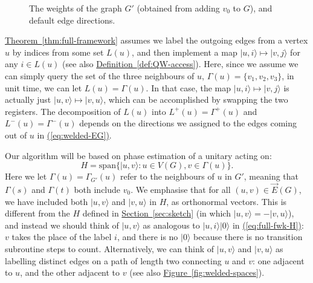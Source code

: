 \documentclass{theoretics}
\newcommand{\eq}[1]{\hyperref[eq:#1]{(\ref*{eq:#1})}}
\renewcommand{\sec}[1]{\hyperref[sec:#1]{Section~\ref*{sec:#1}}}
\newcommand{\thm}[1]{\hyperref[thm:#1]{Theorem~\ref*{thm:#1}}}
\newcommand{\defin}[1]{\hyperref[def:#1]{Definition~\ref*{def:#1}}}
\newcommand{\fig}[1]{\hyperref[fig:#1]{Figure~\ref*{fig:#1}}}
\def\ket#1{{\lvert}#1\rangle}
\renewcommand{\>}{\rangle}
\newcommand{\<}{\langle}
\renewcommand{\(}{\left(}
\renewcommand{\)}{\right)}
\begin{document}
\begin{figure}
\caption{The weights of the graph $G'$ (obtained from adding $v_0$ to $G$), and default edge directions.}\label{fig:welded-trees-weights}
\end{figure}


\thm{full-framework} assumes we label the outgoing edges from a vertex $u$ by indices from some set $L(u)$, and then implement a map $\ket{u,i}\mapsto \ket{v,j}$ for any $i\in L(u)$ (see also \defin{QW-access}). Here, since we assume we can simply query the set of the three neighbours of $u$, $\Gamma(u)=\{v_1,v_2,v_3\}$, in unit time, we can let $L(u)=\Gamma(u)$. In that case, the map $\ket{u,i}\mapsto\ket{v,j}$ is actually just $\ket{u,v}\mapsto \ket{v,u}$, which can be accomplished by swapping the two registers. The decomposition of $L(u)$ into $L^+(u)=\Gamma^+(u)$ and $L^-(u)=\Gamma^-(u)$ depends on the directions we assigned to the edges coming out of $u$ in \eq{welded-EG}. 

Our algorithm will be based on phase estimation of a unitary acting on:
\begin{equation}
H=\mathrm{span}\{\ket{u,v}:u\in V(G),v\in\Gamma(u)\}.\label{eq:welded-H}
\end{equation}
Here we let $\Gamma(u)=\Gamma_{G'}(u)$ refer to the neighbours of $u$ in $G'$, meaning that $\Gamma(s)$ and $\Gamma(t)$ both include $v_0$. We emphasise that for all $(u,v)\in \overrightarrow{E}(G)$, we have included both $\ket{u,v}$ and $\ket{v,u}$ in $H$, as orthonormal vectors. This is different from the $H$ defined in \sec{sketch} (in which $\ket{u,v}=-\ket{v,u}$), and instead we should think of $\ket{u,v}$ as analogous to $\ket{u,i}\ket{0}$ in \eq{full-fwk-H}: $v$ takes the place of the label $i$, and there is no $\ket{0}$ because there is no transition subroutine steps to count. Alternatively, we can think of $\ket{u,v}$ and $\ket{v,u}$ as labelling distinct edges on a path of length two connecting $u$ and $v$: one adjacent to $u$, and the other adjacent to $v$ (see also \fig{welded-spaces}).
\end{document}
